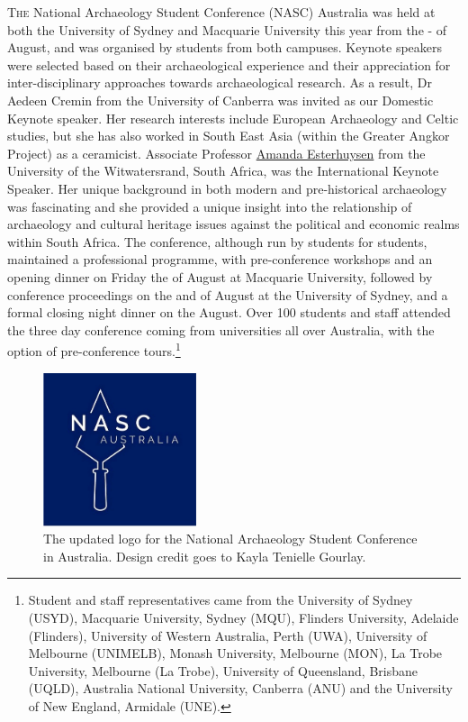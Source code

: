 \lettrine[nindent=0em,lines=3]{T}{he} National Archaeology Student Conference (NASC) Australia was held at both the University of Sydney and Macquarie University this year from the - of August, and was organised by students from both campuses. Keynote speakers were selected based on their archaeological experience and their appreciation for inter-disciplinary approaches towards archaeological research. As a result, Dr Aedeen Cremin from the University of Canberra was invited as our Domestic Keynote speaker. Her research interests include European Archaeology and Celtic studies, but she has also worked in South East Asia (within the Greater Angkor Project) as a ceramicist. Associate Professor \href{https://wits.academia.edu/AmandaEsterhuysen}{Amanda Esterhuysen} from the University of the Witwatersrand, South Africa, was the International Keynote Speaker. Her unique background in both modern and pre-historical archaeology was fascinating and she provided a unique insight into the relationship of archaeology and cultural heritage issues against the political and economic realms within South Africa. The conference, although run by students for students, maintained a professional programme, with pre-conference workshops and an opening dinner on Friday the  of August at Macquarie University, followed by conference proceedings on the  and  of August at the University of Sydney, and a formal closing night dinner on the  August. Over 100 students and staff attended the three day conference coming from universities all over Australia, with the option of pre-conference tours.\footnote{Student and staff representatives came from the University of Sydney (USYD), Macquarie University, Sydney (MQU), Flinders University, Adelaide (Flinders), University of Western Australia, Perth (UWA), University of Melbourne (UNIMELB), Monash University, Melbourne (MON), La Trobe University, Melbourne (La Trobe), University of Queensland, Brisbane (UQLD), Australia National University, Canberra (ANU) and the University of New England, Armidale (UNE).}
	

\begin{figure} 
	\vspace{-20pt}
	\begin{center}
		\includegraphics[width=0.4\textwidth]{figures/NASC_Fig1.jpg}%
		\caption{The updated logo for the National Archaeology Student Conference in Australia. Design credit goes to Kayla Tenielle Gourlay.}
		\label{fig:NASC_Fig1}
	\end{center}
	\vspace{-20pt}
	\vspace{1pt}
\end{figure} 

